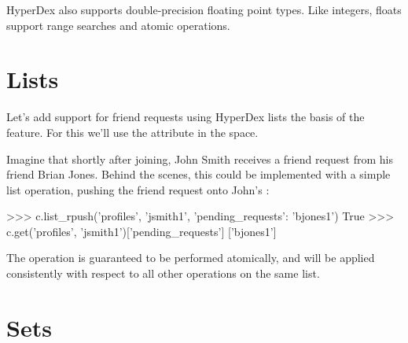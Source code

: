 HyperDex also supports double-precision floating point types.  Like integers,
floats support range searches and atomic operations.

\section{Lists}
\label{sec:data-types:lists}

Let's add support for friend requests using HyperDex lists the basis of the
feature.  For this we'll use the  attribute in the
 space.
 
Imagine that shortly after joining, John Smith receives a friend request from
his friend Brian Jones.  Behind the scenes, this could be implemented with a
simple list operation, pushing the friend request onto John's
:

\begin{pythoncode}
>>> c.list_rpush('profiles', 'jsmith1', {'pending_requests': 'bjones1'})
True
>>> c.get('profiles', 'jsmith1')['pending_requests']
['bjones1']
\end{pythoncode}

The operation  is guaranteed to be performed atomically, and
will be applied consistently with respect to all other operations on the same
list.

\begin{comment} %
Note that lists provide both an lpush and rpush operation. The former adds the
new element at the head of the list, while the latter adds at the tail. They
also provide lpop operation for taking an element off the head of the list.
Coupled together, these operations provide a comprehensive list datatype that
can be used to implement fault-tolerant lists of all kinds. For instnace, one
can implement work queues and generalized producer-consumer patterns on top of
HyperDex lists in a pretty straightforward fashion. In this case, producers
would push at one end of the list (the tail, with an rpush) and consumers would
pop from the other (the head, with a pop). Since the operations are atomic, no
additional synchronization would be necessary, enabling a high-performance
implementation.
\end{comment}

\section{Sets}
\label{sec:data-types:sets}

